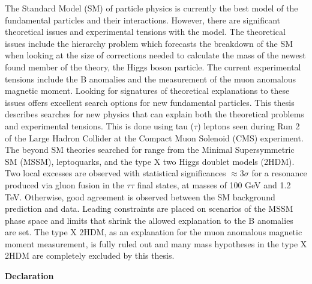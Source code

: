 \begin{titlepage}
\begin{adjustwidth}{1cm}{1cm}
The Standard Model (SM) of particle physics is currently the best model of the fundamental particles and their interactions. 
However, there are significant theoretical issues and experimental tensions with the model. 
The theoretical issues include the hierarchy problem which forecasts the breakdown of the SM when looking at the size of corrections needed to calculate the mass of the newest found member of the theory, the Higgs boson particle. 
The current experimental tensions include the B anomalies and the measurement of the muon anomalous magnetic moment. 
Looking for signatures of theoretical explanations to these issues offers excellent search options for new fundamental particles. 
This thesis describes searches for new physics that can explain both the theoretical problems and experimental tensions. 
This is done using tau ($\tau$) leptons seen during Run 2 of the Large Hadron Collider at the Compact Muon Solenoid (CMS) experiment. 
The beyond SM theories searched for range from the Minimal Supersymmetric SM (MSSM), leptoquarks, and the type X two Higgs doublet models (2HDM). 
Two local excesses are observed with statistical significances $\approx 3\sigma$ for a resonance produced via gluon fusion in the $\tau\tau$ final states, at masses of 100 GeV and 1.2 TeV. 
Otherwise, good agreement is observed between the SM background prediction and data.
Leading constraints are placed on scenarios of the MSSM phase space and limits that shrink the allowed explanation to the B anomalies are set.
The type X 2HDM, as an explanation for the muon anomalous magnetic moment measurement, is fully ruled out and many mass hypotheses in the type X 2HDM are completely excluded by this thesis.
\end{adjustwidth}
\vspace*{\fill}
\newpage

\vspace*{\fill}
\begin{adjustwidth}{1cm}{1cm}
\begin{center}
\Large \textbf{Declaration}
\vspace{0.5cm}
\end{center}


\end{adjustwidth}
\end{titlepage}
